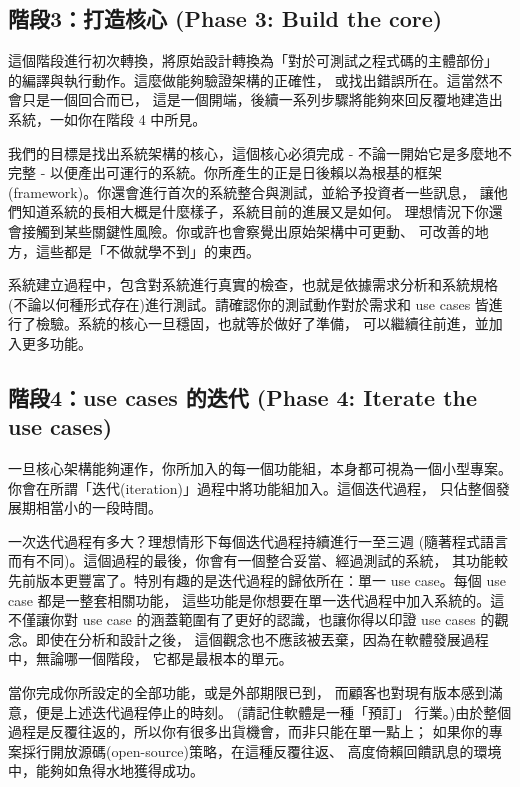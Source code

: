 \subsection{階段3：打造核心 (Phase 3: Build the core)}
這個階段進行初次轉換，將原始設計轉換為「對於可測試之程式碼的主體部份」
的編譯與執行動作。這麼做能夠驗證架構的正確性，
或找出錯誤所在。這當然不會只是一個回合而已，
這是一個開端，後續一系列步驟將能夠來回反覆地建造出系統，一如你在階段 4 中所見。

我們的目標是找出系統架構的核心，這個核心必須完成 - 不論一開始它是多麼地不完整 -
以便產出可運行的系統。你所產生的正是日後賴以為根基的框架
(framework)。你還會進行首次的系統整合與測試，並給予投資者一些訊息，
讓他們知道系統的長相大概是什麼樣子，系統目前的進展又是如何。
理想情況下你還會接觸到某些關鍵性風險。你或許也會察覺出原始架構中可更動、
可改善的地方，這些都是「不做就學不到」的東西。

系統建立過程中，包含對系統進行真實的檢查，也就是依據需求分析和系統規格
(不論以何種形式存在)進行測試。請確認你的測試動作對於需求和
use cases 皆進行了檢驗。系統的核心一旦穩固，也就等於做好了準備，
可以繼續往前進，並加入更多功能。
\subsection{階段4：use cases 的迭代 (Phase 4: Iterate the use cases)}
一旦核心架構能夠運作，你所加入的每一個功能組，本身都可視為一個小型專案。
你會在所謂「迭代(iteration)」過程中將功能組加入。這個迭代過程，
只佔整個發展期相當小的一段時間。

\bigskip
\noindent
{}
\bigskip

一次迭代過程有多大？理想情形下每個迭代過程持續進行一至三週
(隨著程式語言而有不同)。這個過程的最後，你會有一個整合妥當、經過測試的系統，
其功能較先前版本更豐富了。特別有趣的是迭代過程的歸依所在：單一
use case。每個 use case 都是一整套相關功能，
這些功能是你想要在單一迭代過程中加入系統的。這不僅讓你對 use case
的涵蓋範圍有了更好的認識，也讓你得以印證
use cases 的觀念。即使在分析和設計之後，
這個觀念也不應該被丟棄，因為在軟體發展過程中，無論哪一個階段，
它都是最根本的單元。

當你完成你所設定的全部功能，或是外部期限已到，
而顧客也對現有版本感到滿意，便是上述迭代過程停止的時刻。
(請記住軟體是一種「預訂」
行業。)由於整個過程是反覆往返的，所以你有很多出貨機會，而非只能在單一點上；
如果你的專案採行開放源碼(open-source)策略，在這種反覆往返、
高度倚賴回饋訊息的環境中，能夠如魚得水地獲得成功。

